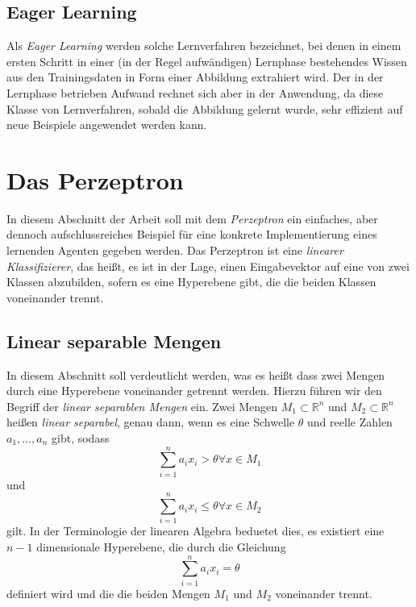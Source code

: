 \documentclass[a4paper]{scrartcl}
\begin{document}
\begin{multicols}{2}
            \subsection{Eager Learning}
                Als \emph{Eager Learning} werden solche Lernverfahren bezeichnet, bei denen in einem ersten Schritt in einer (in der Regel aufwändigen) Lernphase bestehendes Wissen aus den Trainingsdaten in Form einer Abbildung extrahiert wird.
                Der in der Lernphase betrieben Aufwand rechnet sich aber in der Anwendung, da diese Klasse von Lernverfahren, sobald die Abbildung gelernt wurde, sehr effizient auf neue Beispiele angewendet werden kann.\cite{ertel2016} 

        \section{Das Perzeptron}
            In diesem Abschnitt der Arbeit soll mit dem \emph{Perzeptron} ein einfaches, aber dennoch aufschlussreiches Beispiel für eine konkrete Implementierung eines lernenden Agenten gegeben werden.
            \newline
            Das Perzeptron ist eine \emph{linearer Klassifizierer}, das heißt, es ist in der Lage, einen Eingabevektor auf eine von zwei Klassen abzubilden, sofern es eine Hyperebene gibt, die die beiden Klassen voneinander trennt.

            \subsection{Linear separable Mengen}
                In diesem Abschnitt soll verdeutlicht werden, was es heißt dass zwei Mengen durch eine Hyperebene voneinander getrennt werden.
                Hierzu führen wir den Begriff der 
                \emph{linear separablen Mengen} ein.
                \newline
                Zwei Mengen $M_1 \subset \mathbb{R}^n$ und $M_2 \subset \mathbb{R}^n$ heißen \emph{linear separabel}, genau dann, wenn es eine Schwelle $\theta$ und reelle Zahlen $a_1,\dots,a_n$ gibt, sodass
                $$
                    \sum_{i=1}^n a_ix_i > \theta \forall x \in M_1$$
                und
                $$\sum_{i=1}^n a_ix_i \leq \theta \forall x \in M_2$$
                gilt.
                \newline
                In der Terminologie der linearen Algebra beduetet dies, es existiert eine $n-1$ dimensionale Hyperebene, die durch die Gleichung
                $$
                    \sum_{i=1}^n a_ix_i = \theta
                $$
                definiert wird und die die beiden Mengen $M_1$ und $M_2$ voneinander trennt.


\end{multicols}
\end{document}
